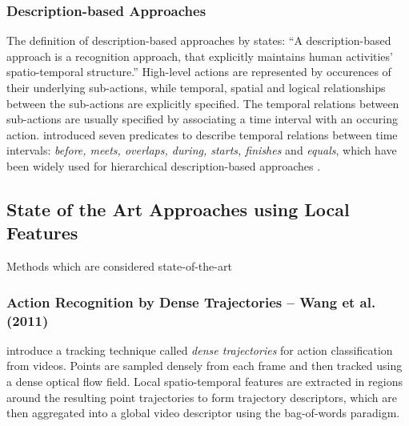 \subsubsection{Description-based Approaches}
The definition of description-based approaches by \textcite{aggarwal_human_2011} states: ``A description-based approach is a recognition approach, that explicitly maintains human activities' spatio-temporal structure.''
High-level actions are represented by occurences of their underlying sub-actions, while temporal, spatial and logical relationships between the sub-actions are explicitly specified.
The temporal relations between sub-actions are usually specified by associating a time interval with an occuring action.
\textcite{allen_maintaining_1983}\cite{allen_actions_1994} introduced seven predicates to describe temporal relations between time intervals: \textit{before, meets, overlaps, during, starts, finishes} and \textit{equals}, which have been widely used for hierarchical description-based approaches \cite{pinhanez_human_1998}\cite{siskind_grounding_2001}\cite{nevatia_hierarchical_2003}\cite{ryoo_recognition_2006}.


\subsection{State of the Art Approaches using Local Features}
\label{subsec:conventionalsota}

Methods which are considered state-of-the-art \cite{wang_towards_2015}

\subsubsection{Action Recognition by Dense Trajectories -- Wang et al. (2011)}

\textcite{wang_action_2011} introduce a tracking technique called \textit{dense trajectories} for action classification from videos.
Points are sampled densely from each frame and then tracked using a dense optical flow field.
Local spatio-temporal features are extracted in regions around the resulting point trajectories to form trajectory descriptors, which are then aggregated into a global video descriptor using the bag-of-words paradigm.

%

